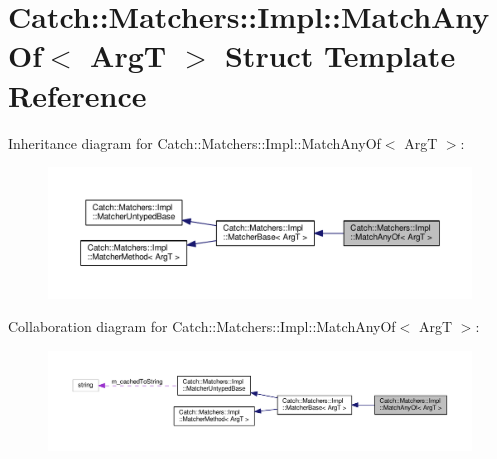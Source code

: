 \hypertarget{structCatch_1_1Matchers_1_1Impl_1_1MatchAnyOf}{}\section{Catch\+:\+:Matchers\+:\+:Impl\+:\+:Match\+Any\+Of$<$ ArgT $>$ Struct Template Reference}
\label{structCatch_1_1Matchers_1_1Impl_1_1MatchAnyOf}


Inheritance diagram for Catch\+:\+:Matchers\+:\+:Impl\+:\+:Match\+Any\+Of$<$ ArgT $>$\+:\nopagebreak
\begin{figure}[H]
\begin{center}
\leavevmode
\includegraphics[width=350pt]{structCatch_1_1Matchers_1_1Impl_1_1MatchAnyOf__inherit__graph}
\end{center}
\end{figure}


Collaboration diagram for Catch\+:\+:Matchers\+:\+:Impl\+:\+:Match\+Any\+Of$<$ ArgT $>$\+:\nopagebreak
\begin{figure}[H]
\begin{center}
\leavevmode
\includegraphics[width=350pt]{structCatch_1_1Matchers_1_1Impl_1_1MatchAnyOf__coll__graph}
\end{center}
\end{figure}
